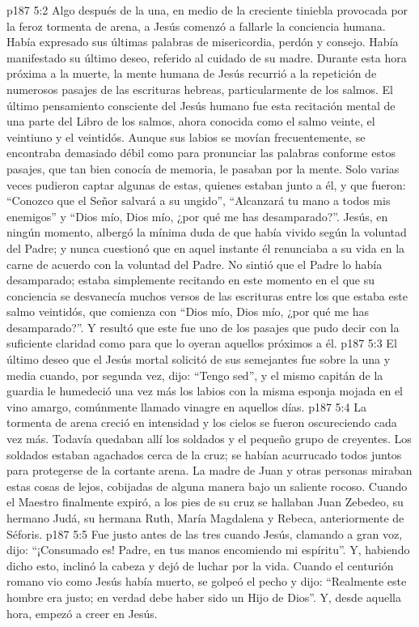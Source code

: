 \vs p187 5:2 Algo después de la una, en medio de la creciente tiniebla provocada por la feroz tormenta de arena, a Jesús comenzó a fallarle la conciencia humana. Había expresado sus últimas palabras de misericordia, perdón y consejo. Había manifestado su último deseo, referido al cuidado de su madre. Durante esta hora próxima a la muerte, la mente humana de Jesús recurrió a la repetición de numerosos pasajes de las escrituras hebreas, particularmente de los salmos. El último pensamiento consciente del Jesús humano fue esta recitación mental de una parte del Libro de los salmos, ahora conocida como el salmo veinte, el veintiuno y el veintidós. Aunque sus labios se movían frecuentemente, se encontraba demasiado débil como para pronunciar las palabras conforme estos pasajes, que tan bien conocía de memoria, le pasaban por la mente. Solo varias veces pudieron captar algunas de estas, quienes estaban junto a él, y que fueron: “Conozco que el Señor salvará a su ungido”, “Alcanzará tu mano a todos mis enemigos” y “Dios mío, Dios mío, ¿por qué me has desamparado?”. Jesús, en ningún momento, albergó la mínima duda de que había vivido según la voluntad del Padre; y nunca cuestionó que en aquel instante él renunciaba a su vida en la carne de acuerdo con la voluntad del Padre. No sintió que el Padre lo había desamparado; estaba simplemente recitando en este momento en el que su conciencia se desvanecía muchos versos de las escrituras entre los que estaba este salmo veintidós, que comienza con “Dios mío, Dios mío, ¿por qué me has desamparado?”. Y resultó que este fue uno de los pasajes que pudo decir con la suficiente claridad como para que lo oyeran aquellos próximos a él.
\vs p187 5:3 \pc El último deseo que el Jesús mortal solicitó de sus semejantes fue sobre la una y media cuando, por segunda vez, dijo: “Tengo sed”, y el mismo capitán de la guardia le humedeció una vez más los labios con la misma esponja mojada en el vino amargo, comúnmente llamado vinagre en aquellos días.
\vs p187 5:4 \pc La tormenta de arena creció en intensidad y los cielos se fueron oscureciendo cada vez más. Todavía quedaban allí los soldados y el pequeño grupo de creyentes. Los soldados estaban agachados cerca de la cruz; se habían acurrucado todos juntos para protegerse de la cortante arena. La madre de Juan y otras personas miraban estas cosas de lejos, cobijadas de alguna manera bajo un saliente rocoso. Cuando el Maestro finalmente expiró, a los pies de su cruz se hallaban Juan Zebedeo, su hermano Judá, su hermana Ruth, María Magdalena y Rebeca, anteriormente de Séforis.
\vs p187 5:5 Fue justo antes de las tres cuando Jesús, clamando a gran voz, dijo: “¡Consumado es! Padre, en tus manos encomiendo mi espíritu”. Y, habiendo dicho esto, inclinó la cabeza y dejó de luchar por la vida. Cuando el centurión romano vio como Jesús había muerto, se golpeó el pecho y dijo: “Realmente este hombre era justo; en verdad debe haber sido un Hijo de Dios”. Y, desde aquella hora, empezó a creer en Jesús.

